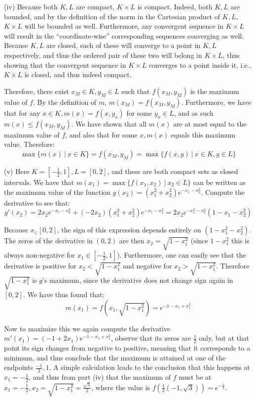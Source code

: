 \begin{solution}
    (iv) Because both $K, L$ are compact, $K \times L$ is compact. Indeed, both $K, L$ are bounded, and by the definition of the norm in the Cartesian product of $K, L$, $K \times L$ will be bounded as well. Furthermore, any convergent sequence in $K \times L$ will result in the ``coordinate-wise'' corresponding sequences converging as well. Because $K, L$ are closed, each of these will converge to a point in $K, L$ respectively, and thus the ordered pair of these two will belong in $K \times L$, thus showing that the convergent sequence in $K \times L$ converges to a point inside it, i.e., $K \times L$ is closed, and thus indeed compact.
    
    Therefore, there exist $x_{M} \in K, y_{M} \in L$ such that $f(x_M, y_M)$ is the maximum value of $f$. By the definition of $m$, $m(x_M) = f(x_M, y_M)$. Furthermore, we have that for any $x \in K, m(x) = f(x, y_x)$ for some $y_x \in L$, and as such $m(x) \leq f(x_M, y_M)$. We have shown that all $m(x)$ are at most equal to the maximum value of $f$, and also that for some $x, m(x)$ equals this maximum value. Therefore:
    $$\max\{m(x) \ \rvert \ x \in K\} = f(x_M, y_M) = \max\{f(x, y) \ \rvert \ x \in K, y \in L\}$$

    (v) Here $K = [-\frac{1}{2}, 1], L = [0, 2]$, and these are both compact sets as closed intervals. We have that $m(x_1) = \max\{f(x_1, x_2) \ \rvert \ x_2 \in L\}$ can be written as the maximum value of the function $g(x_2) = (x_1^2 + x_2^2)e^{-x_1-x_2^2}$. Compute the derivative to see that:
    $$g'(x_2) = 2x_2e^{-x_1-x_2^2} + (-2x_2)(x_1^2+x_2^2)e^{-x_1-x_2^2} = 2x_2e^{-x_1^2-x_2^2}(1 - x_1-x_2^2)$$

    Because $x_ \in [0, 2]$, the sign of this expression depends entirely on $(1-x_1^2-x_2^2)$. The zeros of the derivative in $(0, 2)$ are then $x_2 = \sqrt{1-x_1^2}$ (since $1-x_1^2$ this is always non-negative for $x_1 \in [-\frac{1}{2}, 1]$). Furthermore, one can easily see that the derivative is positive for $x_2 < \sqrt{1 - x_1^2}$ and negative for $x_2 > \sqrt{1 - x_1^2}$. Therefore $\sqrt{1 - x_1^2}$ is $g$'s maximum, since the derivative does not change sign again in $[0, 2]$. We have thus found that:
    $$m(x_1) = f(x_1, \sqrt{1 - x_1^2}) = e^{-1-x_1+x_1^2}$$

    Now to maximize this we again compute the derivative $m'(x_1) = (-1+2x_1)e^{-1-x_1+x_1^2}$, observe that its zeros are $\frac{1}{2}$ only, but at that point its sign changes from negative to positive, meaning that it corresponds to a minimum, and thus conclude that the maximum is attained at one of the endpoints $\frac{-1}{2}, 1$. A simple calculation leads to the conclusion that this happens at $x_1 = -\frac{1}{2}$, and thus from part (iv) that the maximum of $f$ must be at $x_1 = -\frac{1}{2}, x_2 = \sqrt{1-x_1^2} = \frac{\sqrt{3}}{2}$, where the value is $f(\frac{1}{2}(-1, \sqrt{3})) = e^{-\frac{1}{4}}$.
\end{solution}